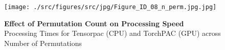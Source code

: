         \clearpage
        \begin{figure}[ht]
        	\centering
            \texttt{[image: ./src/figures/src/jpg/Figure\_ID\_08\_n\_perm.jpg.jpg]}

\caption{\textbf{
Effect of Permutation Count on Processing Speed
}
\smallskip
\\
Processing Times for Tensorpac (CPU) and TorchPAC (GPU) across Number of Permutations
}
        	\label{fig:08_n_perm}
        \end{figure}
